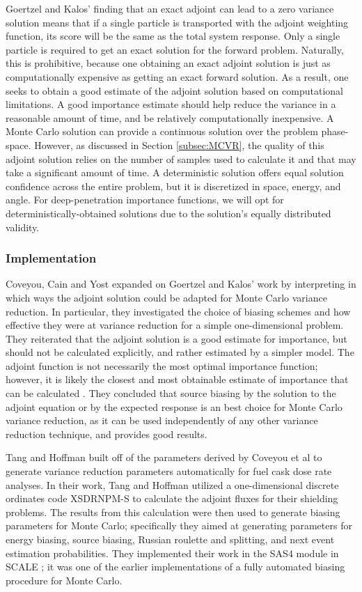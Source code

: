 Goertzel and Kalos' finding that an exact adjoint can lead to a zero variance
solution means that if a single particle is transported with the adjoint
weighting function, its score will be the same as the total system response.
Only a single particle is required to get an exact solution for the forward
problem. Naturally, this is prohibitive, because one obtaining
an exact adjoint solution is just as computationally expensive as getting
an exact forward solution. As a result, one seeks to obtain a good estimate of the
adjoint solution based on computational limitations. A good importance estimate
should help reduce the variance in a reasonable amount of time, and be
relatively computationally inexpensive. A Monte Carlo solution can
provide a continuous solution over the problem phase-space. However, as
discussed in Section \ref{subsec:MCVR}, the quality of this adjoint solution
relies on the number of samples used to calculate it and that may take a
significant amount of time. A deterministic solution
offers equal solution confidence across the entire problem, but it is
discretized
in space, energy, and angle. For deep-penetration importance functions, we will
opt for deterministically-obtained solutions due to the solution's equally
distributed validity.

\subsubsection{Implementation}

Coveyou, Cain and Yost \cite{coveyou_adjoint_1967} expanded on Goertzel and
Kalos' work by interpreting in which ways the adjoint solution could be adapted
for Monte Carlo variance reduction. In particular, they investigated the choice
of biasing schemes and how effective they were at variance reduction for a
simple one-dimensional problem. They reiterated that the adjoint solution is a
good estimate for importance, but should not be calculated explicitly, and
rather estimated by a simpler model. The adjoint function is not necessarily the
most optimal importance function; however, it is likely the closest and most
obtainable estimate of importance that can be calculated
\cite{coveyou_adjoint_1967}. They
concluded that source biasing by the solution to the adjoint equation or by the
expected response is an best choice for Monte Carlo variance reduction, as it
can be used independently of any other variance reduction technique, and
provides good results.

Tang and Hoffman \cite{tang_monte_1988} built off of the parameters derived by
Coveyou et al \cite{coveyou_adjoint_1967} to generate variance reduction
parameters automatically for fuel cask dose rate analyses. In their work, Tang
and Hoffman utilized a one-dimensional discrete ordinates code XSDRNPM-S to
calculate the adjoint fluxes for their shielding problems. The results from this
calculation were then used to generate biasing parameters for Monte Carlo;
specifically they aimed at generating parameters for energy biasing, source
biasing, Russian roulette and splitting, and next event estimation
probabilities. They implemented their work in the SAS4 module in SCALE
\cite{SCALE6_1}; it was
one of the earlier implementations of a fully automated biasing procedure for
Monte Carlo.

